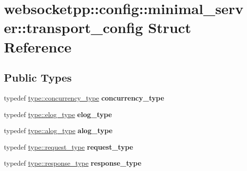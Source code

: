 \hypertarget{structwebsocketpp_1_1config_1_1minimal__server_1_1transport__config}{}\section{websocketpp\+:\+:config\+:\+:minimal\+\_\+server\+:\+:transport\+\_\+config Struct Reference}
\label{structwebsocketpp_1_1config_1_1minimal__server_1_1transport__config}
\subsection*{Public Types}
\begin{DoxyCompactItemize}
\item 
\mbox{\label{structwebsocketpp_1_1config_1_1minimal__server_1_1transport__config_a753cbfdd821f9a6643ba8ee70d4834e6}} 
typedef \mbox{\hyperlink{classwebsocketpp_1_1concurrency_1_1none}{type\+::concurrency\+\_\+type}} {\bfseries concurrency\+\_\+type}
\item 
\mbox{\label{structwebsocketpp_1_1config_1_1minimal__server_1_1transport__config_a678324060123483e9513cbcd24829cba}} 
typedef \mbox{\hyperlink{structwebsocketpp_1_1config_1_1minimal__server_ab8a516661fb2ddd3a3c377823b623c1a}{type\+::elog\+\_\+type}} {\bfseries elog\+\_\+type}
\item 
\mbox{\label{structwebsocketpp_1_1config_1_1minimal__server_1_1transport__config_a09acf498effc5c29b26e50a98ce2b8e9}} 
typedef \mbox{\hyperlink{classwebsocketpp_1_1log_1_1stub}{type\+::alog\+\_\+type}} {\bfseries alog\+\_\+type}
\item 
\mbox{\label{structwebsocketpp_1_1config_1_1minimal__server_1_1transport__config_ac45b02a9778ad3371ace822e80d43f8d}} 
typedef \mbox{\hyperlink{classwebsocketpp_1_1http_1_1parser_1_1request}{type\+::request\+\_\+type}} {\bfseries request\+\_\+type}
\item 
\mbox{\label{structwebsocketpp_1_1config_1_1minimal__server_1_1transport__config_a5d29cd10696d9a67ad9baf580db6eddf}} 
typedef \mbox{\hyperlink{classwebsocketpp_1_1http_1_1parser_1_1response}{type\+::response\+\_\+type}} {\bfseries response\+\_\+type}
\end{DoxyCompactItemize}
